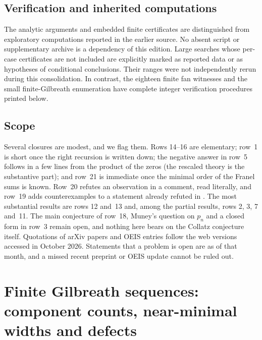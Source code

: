 \documentclass[11pt,a4paper]{article}
\theoremstyle{definition}
\theoremstyle{remark}
\numberwithin{equation}{section}
\begin{document}
\subsection{Verification and inherited computations}
The analytic arguments and embedded finite certificates are distinguished
from exploratory computations reported in the earlier source. No absent
script or supplementary archive is a dependency of this edition. Large
searches whose per-case certificates are not included are explicitly marked
as reported data or as hypotheses of conditional conclusions. Their ranges
were not independently rerun during this consolidation. In contrast, the
eighteen finite fan witnesses and the small finite-Gilbreath enumeration have
complete integer verification procedures printed below.

\subsection{Scope}
Several closures are modest, and we flag them. Rows 14--16 are elementary;
row~1 is short once the right recursion is written down; the negative answer
in row~5 follows in a few lines from the product of the zeros (the rescaled
theory is the substantive part); and row~21 is immediate once the minimal
order of the Franel sums \cite{R019} is known. Row~20 refutes an observation
in a comment, read literally, and row~19 adds counterexamples to a statement
already refuted in \cite{R021}. The most substantial results are rows 12
and~13 and, among the partial results, rows 2, 3, 7 and~11. The main
conjecture of row~18, Muney's question on $p_n$ and a closed form in row~3
remain open, and nothing here bears on the Collatz conjecture itself.
Quotations of arXiv papers and OEIS entries follow the web versions accessed
in October 2026. Statements that a problem is open are as of that month, and a
missed recent preprint or OEIS update cannot be ruled out.

\section{Finite Gilbreath sequences: component counts, near-minimal widths and defects}\label{B:G:sec}

\providecommand{\cG}{\mathcal{G}}
\providecommand{\ncomp}{\operatorname{\#comp}}
\providecommand{\Ind}[1]{[\,#1\,]}
\end{document}
